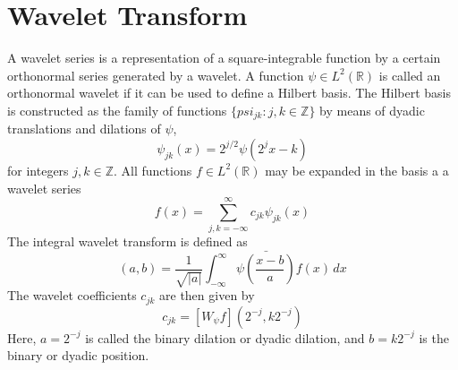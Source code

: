 \documentclass[11pt]{report}
\theoremstyle{example}
\begin{document}
\section{Wavelet Transform}
A wavelet series is a representation of a square-integrable function by a certain orthonormal series generated by a wavelet. A function $\psi\in L^2(\mathbb{R})$ is called an orthonormal wavelet if it can be used to define a Hilbert basis. The Hilbert basis is constructed as the family of functions $\{psi_{jk}:j,k\in\mathbb{Z}\}$ by means of dyadic translations and dilations of $\psi$,
\begin{equation}
	\psi_{jk}(x)=2^{j/2}\psi(2^jx-k)
\end{equation}
for integers $j,k\in\mathbb{Z}$.
All functions $f\in L^2(\mathbb{R})$ may be expanded in the basis a a wavelet series
\begin{equation}
	f(x)=\sum_{j,k=-\infty}^\infty{c_{jk}\psi_{jk}(x)}
\end{equation}
The integral wavelet transform is defined as 
\begin{equation}
	[W_\psi f](a,b)=\frac{1}{\sqrt{|a|}}\int_{-\infty}^\infty{\bar{\psi\left(\frac{x-b}{a}\right)}f(x)\,dx}
\end{equation}
The wavelet coefficients $c_{jk}$ are then given by
\begin{equation}
	c_{jk}=[W_\psi f](2^{-j},k2^{-j})
\end{equation}
Here, $a=2^{-j}$ is called the binary dilation or dyadic dilation, and $b=k2^{-j}$ is the binary or dyadic position.
\end{document}
